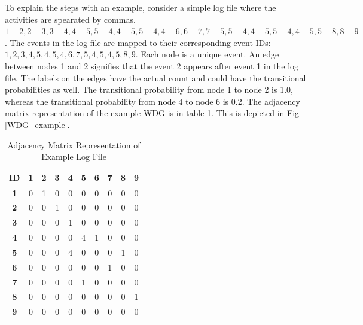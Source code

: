\begin{enumerate}
\begin{enumerate}
To explain the steps with an example, consider a simple log file where the activities are spearated by commas. $1-2, 2-3, 3-4, 4-5, 5-4, 4-5, 5-4, 4-6, 6-7, 7-5, 5-4, 4-5, 5-4, 4-5, 5-8, 8-9$. The events in the log file are mapped to their corresponding event IDs: $1, 2, 3, 4, 5, 4, 5, 4, 6, 7, 5, 4, 5, 4, 5, 8, 9$. Each node is a unique event. An edge between nodes 1 and 2 signifies that the event 2  appears after event 1  in the log file. The labels on the edges have the actual count and could have the transitional probabilities as well. The transitional probability from node 1 to node 2 is 1.0, whereas the transitional probability from node 4 to node 6 is 0.2. The adjacency matrix representation of the example WDG is in table \ref{Adjacency_example_log}. This is depicted in Fig \ref{WDG_example}.

\begin{table}[!t]
\caption{Adjacency Matrix Representation of Example Log File}
\label{Adjacency_example_log}
\centering
\begin{tabular}{|c|c|c|c|c|c|c|c|c|c|}
\hline
  {\bf ID} &    {\bf 1} &    {\bf 2} &    {\bf 3} &    {\bf 4} &    {\bf 5} &    {\bf 6} &    {\bf 7} &    {\bf 8} &    {\bf 9} \\
\hline
   {\bf 1} &          0 &          1 &          0 &          0 &          0 &          0 &          0 &          0 &          0 \\
\hline
   {\bf 2} &          0 &          0 &          1 &          0 &          0 &          0 &          0 &          0 &          0 \\
\hline
   {\bf 3} &          0 &          0 &          0 &          1 &          0 &          0 &          0 &          0 &          0 \\
\hline
   {\bf 4} &          0 &          0 &          0 &          0 &          4 &          1 &          0 &          0 &          0 \\
\hline
   {\bf 5} &          0 &          0 &          0 &          4 &          0 &          0 &          0 &          1 &          0 \\
\hline
   {\bf 6} &          0 &          0 &          0 &          0 &          0 &          0 &          1 &          0 &          0 \\
\hline
   {\bf 7} &          0 &          0 &          0 &          0 &          1 &          0 &          0 &          0 &          0 \\
\hline
   {\bf 8} &          0 &          0 &          0 &          0 &          0 &          0 &          0 &          0 &          1 \\
\hline
   {\bf 9} &          0 &          0 &          0 &          0 &          0 &          0 &          0 &          0 &          0 \\
\hline
\end{tabular}  
\end{table} 


\end{enumerate}
\end{enumerate}
